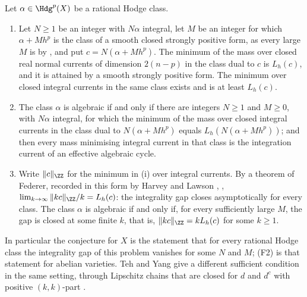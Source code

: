 \begin{theorem}\label{thm:massgap}
Let $\alpha\in\Hdg^{p}(X)$ be a rational Hodge class.
\begin{enumerate}[label=\textup{(\roman*)},leftmargin=2.6em,itemsep=2pt]
\item Let $N\ge1$ be an integer with $N\alpha$ integral, let $M$ be an
  integer for which $\alpha+Mh^{p}$ is the class of a smooth closed strongly
  positive form, as every large $M$ is by , and
  put $c=N(\alpha+Mh^{p})$. The minimum of the mass over closed real normal
  currents of dimension $2(n-p)$ in the class dual to $c$ is $L_{h}(c)$, and
  it is attained by a smooth strongly positive form. The minimum over closed
  integral currents in the same class exists and is at least $L_{h}(c)$.
\item The class $\alpha$ is algebraic if and only if there are integers
  $N\ge1$ and $M\ge0$, with $N\alpha$ integral, for which the minimum of the
  mass over closed integral currents in the class dual to $N(\alpha+Mh^{p})$
  equals $L_{h}(N(\alpha+Mh^{p}))$; and then every mass minimising integral
  current in that class is the integration current of an effective algebraic
  cycle.
\item Write $\|c\|_{\ZZ}$ for the minimum in \textup{(i)} over integral
  currents. By a theorem of Federer, recorded in this form by Harvey and
  Lawson \cite[Section~6]{HL09}, \cite{Fed69,Fed74}, $\lim_{k\to\infty}
  \|kc\|_{\ZZ}/k=L_{h}(c)$: the integrality gap closes asymptotically for
  every class. The class $\alpha$ is algebraic if and only if, for every
  sufficiently large $M$, the gap is closed at some finite $k$, that is,
  $\|kc\|_{\ZZ}=kL_{h}(c)$ for some $k\ge1$.
\end{enumerate}
In particular the conjecture for $X$ is the statement that for every rational
Hodge class the integrality gap of this problem vanishes for some $N$ and $M$;
\textup{(F2)} is that statement for abelian varieties. Teh and Yang give a
different sufficient condition in the same setting, through Lipschitz chains
that are closed for $d$ and $d^{c}$ with positive $(k,k)$-part
\cite[Theorem~4.2]{TY21}.
\end{theorem}

